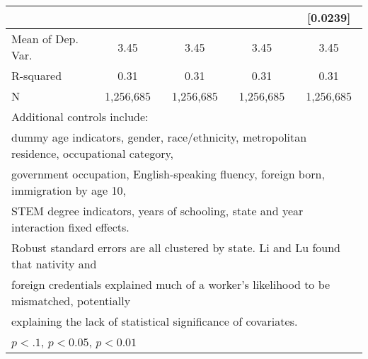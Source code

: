 \begin{table}[htbp]
\begin{tabular}{l*{4}{c}}
                    &                     &                     &                     &    [0.0239]         \\
\midrule
Mean of Dep. Var.   &        3.45         &        3.45         &        3.45         &        3.45         \\
R-squared           &        0.31         &        0.31         &        0.31         &        0.31         \\
N                   &   1,256,685         &   1,256,685         &   1,256,685         &   1,256,685         \\
\bottomrule
\multicolumn{5}{l}{\footnotesize Additional controls include:}\\
\multicolumn{5}{l}{\footnotesize dummy age indicators, gender, race/ethnicity, metropolitan residence, occupational category,}\\
\multicolumn{5}{l}{\footnotesize government occupation, English-speaking fluency, foreign born, immigration by age 10,}\\
\multicolumn{5}{l}{\footnotesize STEM degree indicators, years of schooling, state and year interaction fixed effects.}\\
\multicolumn{5}{l}{\footnotesize Robust standard errors are all clustered by state. Li and Lu found that nativity and}\\
\multicolumn{5}{l}{\footnotesize foreign credentials explained much of a worker's likelihood to be mismatched, potentially}\\
\multicolumn{5}{l}{\footnotesize explaining the lack of statistical significance of covariates.}\\
\multicolumn{5}{l}{\footnotesize \sym{*} \(p<.1\), \sym{**} \(p<0.05\), \sym{***} \(p<0.01\)}\\
\end{tabular}
\end{table}
